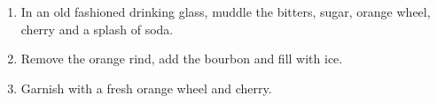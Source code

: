 \documentclass{article}
\begin{document}

\begin{enumerate}
    \item In an old fashioned drinking glass, muddle the bitters, sugar, orange wheel, cherry and a splash of soda.
    \item Remove the orange rind, add the bourbon and fill with ice.
    \item Garnish with a fresh orange wheel and cherry.
\end{enumerate}
\newpage
\end{document}
